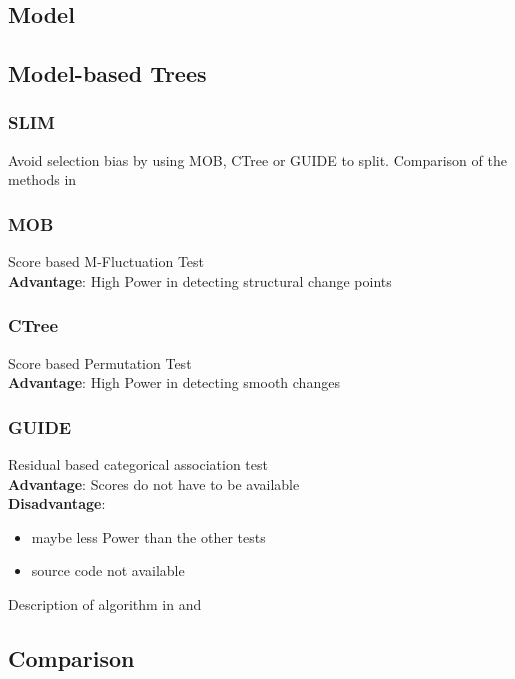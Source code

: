 \subsection{Model}

\subsection{Model-based Trees}
\subsubsection{SLIM}
Avoid selection bias by using MOB, CTree or GUIDE to split.
Comparison of the methods in \citep{Schlosser.24.06.2019}

\subsubsection{MOB}
Score based M-Fluctuation Test \\
\textbf{Advantage}: High Power in detecting structural change points

\subsubsection{CTree}
Score based Permutation Test \\
\textbf{Advantage}: High Power in detecting smooth changes

\subsubsection{GUIDE}
Residual based categorical association test\\
\textbf{Advantage}: Scores do not have to be available\\
\textbf{Disadvantage}: 
\begin{itemize}
    \item maybe less Power than the other tests
    \item source code not available \citep{Loh.2014}
\end{itemize}

Description of algorithm in \citep{Loh.2009} and \citep{.2002}

\subsection{Comparison}


